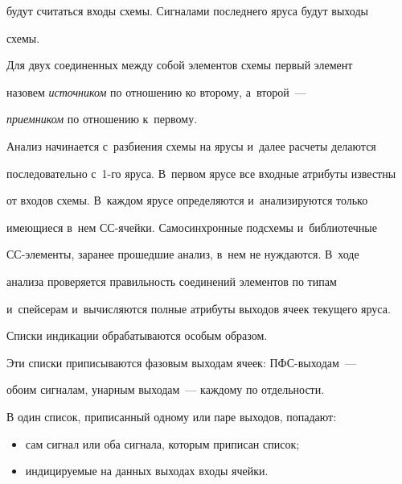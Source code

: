 будут считаться входы схемы. Сигналами последнего яруса будут выходы 


схемы.


   


   Для двух соединенных между собой элементов схемы первый элемент 


назовем \textit{источником} по отношению ко второму, а~второй~--- 


\textit{приемником} по отношению к~первому.


   


   Анализ начинается с~разбиения схемы на ярусы и~далее расчеты делаются 


последовательно с~1-го яруса. В~первом ярусе все входные атрибуты известны 


от входов схемы. В~каждом ярусе определяются и~анализируются только 


имеющиеся в~нем СС-ячей\-ки. Самосинхронные под\-схе\-мы и~библиотечные  


СС-эле\-мен\-ты, заранее прошедшие анализ, в~нем не нуждаются. В~ходе 


анализа проверяется правильность соединений элементов по типам 


и~спейсерам и~вычисляются полные атрибуты выходов ячеек текущего яруса.


   


   Списки индикации обрабатываются особым образом.


   


   Эти списки приписываются фазовым выходам ячеек: ПФС-вы\-хо\-дам~--- 


обоим сигналам, унарным выходам~--- каждому по отдельности.


   


   В один список, приписанный одному или паре выходов, попадают:


   \begin{itemize}


   \item сам сигнал или оба сигнала, которым приписан список;


   \item индицируемые на данных выходах входы ячейки.


   \end{itemize}


